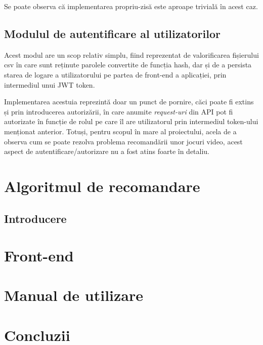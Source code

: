 \documentclass[12pt,a4paper]{report}
\begin{document}
Se poate observa că implementarea propriu-zisă este aproape trivială în acest caz.





\subsection{Modulul de autentificare al utilizatorilor}

Acest modul are un scop relativ simplu, fiind reprezentat de valorificarea fișierului csv în care sunt reținute parolele convertite de funcția hash, dar și de a persista starea de logare a utilizatorului pe partea de front-end a aplicației, prin intermediul unui JWT token. \cite{24}

Implementarea acestuia reprezintă doar un punct de pornire, căci poate fi extins și prin introducerea autorizării, în care anumite \emph{request-uri} din API pot fi autorizate în funcție de rolul pe care îl are utilizatorul prin intermediul token-ului menționat anterior. Totuși, pentru scopul în mare al proiectului, acela de a observa cum se poate rezolva problema recomandării unor jocuri video, acest aspect de autentificare/autorizare nu a fost atins foarte în detaliu.  

\section{Algoritmul de recomandare}

\subsection{Introducere}

\section{Front-end}
\section{Manual de utilizare}
\section{Concluzii}
\end{document}
